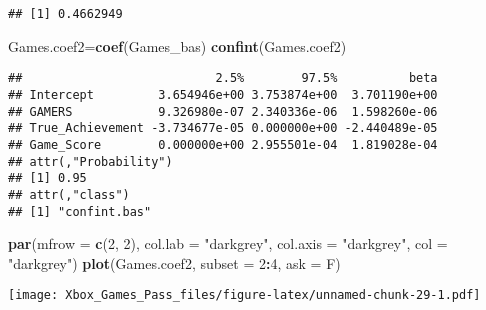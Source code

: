 \documentclass[
]{article}
\newenvironment{Shaded}{\begin{snugshade}}{\end{snugshade}}
\newcommand{\CommentTok}[1]{\textcolor[rgb]{0.56,0.35,0.01}{\textit{#1}}}
\newcommand{\DataTypeTok}[1]{\textcolor[rgb]{0.13,0.29,0.53}{#1}}
\newcommand{\DecValTok}[1]{\textcolor[rgb]{0.00,0.00,0.81}{#1}}
\newcommand{\KeywordTok}[1]{\textcolor[rgb]{0.13,0.29,0.53}{\textbf{#1}}}
\newcommand{\NormalTok}[1]{#1}
\newcommand{\OperatorTok}[1]{\textcolor[rgb]{0.81,0.36,0.00}{\textbf{#1}}}
\newcommand{\StringTok}[1]{\textcolor[rgb]{0.31,0.60,0.02}{#1}}
\begin{document}
\begin{Shaded}
\end{Shaded}

\begin{verbatim}
## [1] 0.4662949
\end{verbatim}

\begin{Shaded}
\begin{Highlighting}[]
\NormalTok{Games.coef2=}\KeywordTok{coef}\NormalTok{(Games_bas)}
\KeywordTok{confint}\NormalTok{(Games.coef2)}
\end{Highlighting}
\end{Shaded}

\begin{verbatim}
##                           2.5%        97.5%          beta
## Intercept         3.654946e+00 3.753874e+00  3.701190e+00
## GAMERS            9.326980e-07 2.340336e-06  1.598260e-06
## True_Achievement -3.734677e-05 0.000000e+00 -2.440489e-05
## Game_Score        0.000000e+00 2.955501e-04  1.819028e-04
## attr(,"Probability")
## [1] 0.95
## attr(,"class")
## [1] "confint.bas"
\end{verbatim}

\begin{Shaded}
\begin{Highlighting}[]
\KeywordTok{par}\NormalTok{(}\DataTypeTok{mfrow =} \KeywordTok{c}\NormalTok{(}\DecValTok{2}\NormalTok{, }\DecValTok{2}\NormalTok{), }\DataTypeTok{col.lab =} \StringTok{"darkgrey"}\NormalTok{, }\DataTypeTok{col.axis =} \StringTok{"darkgrey"}\NormalTok{, }\DataTypeTok{col =} \StringTok{"darkgrey"}\NormalTok{)}
\KeywordTok{plot}\NormalTok{(Games.coef2, }\DataTypeTok{subset =} \DecValTok{2}\OperatorTok{:}\DecValTok{4}\NormalTok{, }\DataTypeTok{ask =}\NormalTok{ F)}
\end{Highlighting}
\end{Shaded}

\texttt{[image: Xbox\_Games\_Pass\_files/figure-latex/unnamed-chunk-29-1.pdf]}
\end{document}
